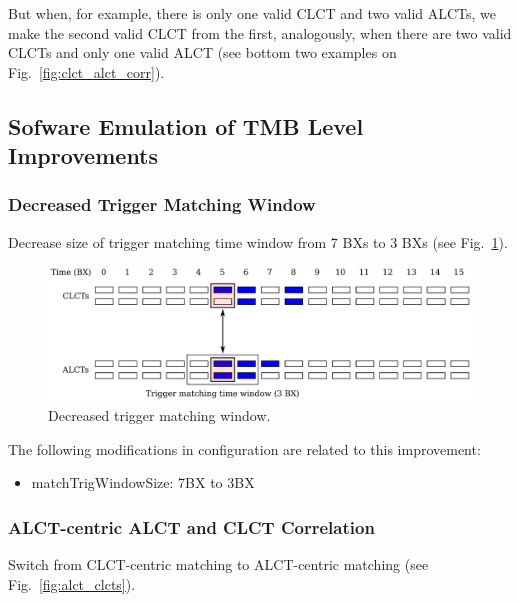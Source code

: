 But when, for example, there is only one valid CLCT and two valid ALCTs, we make the second valid CLCT from the first, analogously, when there are two valid CLCTs and only one valid ALCT (see bottom two examples on Fig.~\ref{fig:clct_alct_corr}).

\newpage
\subsection{Sofware Emulation of TMB Level Improvements}

\subsubsection{Decreased Trigger Matching Window}

Decrease size of trigger matching time window from 7 BXs to 3 BXs (see Fig.~\ref{fig:clct_alcts_short_window}).

\begin{figure}[tbh]
        \begin{center}
                \includegraphics[width=0.98\linewidth]{figures/clct_alcts_short_window.pdf}
                \caption{Decreased trigger matching window.}
                \label{fig:clct_alcts_short_window}
        \end{center}
\end{figure}

The following modifications in configuration are related to this improvement:
\begin{itemize}
    \item matchTrigWindowSize: 7BX to 3BX
\end{itemize}

\subsubsection{ALCT-centric ALCT and CLCT Correlation}

Switch from CLCT-centric matching to ALCT-centric matching (see Fig.~\ref{fig:alct_clcts}).

